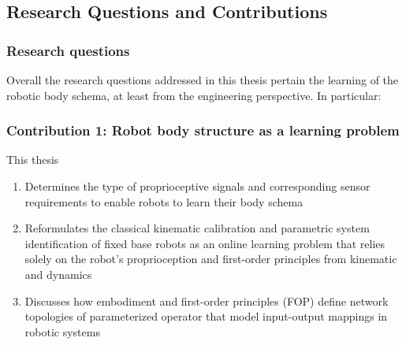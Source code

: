 \documentclass[12pt, a4paper]{article}
\begin{document}
\begin{enumerate}
\subsection*{Research Questions and Contributions}

\subsubsection*{Research questions}
Overall the research questions addressed in this thesis pertain the learning of the robotic body schema, at least from the engineering perspective. In particular:
\begin{shaded}
\end{shaded}
\begin{shaded}
\end{shaded}
\begin{shaded}
\end{shaded}

\subsubsection*{Contribution 1: Robot body structure as a learning problem}
This thesis
\begin{enumerate}
	\item Determines the type of proprioceptive signals and corresponding sensor requirements to enable robots to learn their body schema	
	\item Reformulates the classical kinematic calibration and parametric system identification of fixed base robots as an online learning problem that relies solely on the robot's proprioception and first-order principles from kinematic and dynamics 
	\item Discusses how embodiment and first-order principles (FOP) define network topologies of parameterized operator that model input-output mappings in robotic systems
\end{enumerate}


\end{enumerate}
\end{document}
